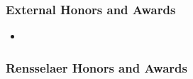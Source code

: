 \subsubsection*{External Honors and Awards}
\begin{itemize}
  \item 
\end{itemize}

\subsubsection*{Rensselaer Honors and Awards}